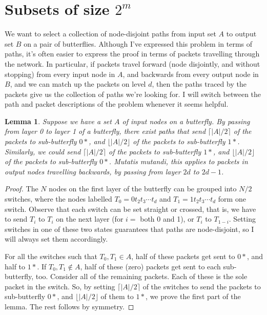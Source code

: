 \documentclass[12pt]{article}
\newtheorem{lemma}{Lemma}
\begin{document}
\section{Subsets of size $2^m$}
We want to select a collection of node-disjoint paths from input set $A$
to output set $B$ on a pair of butterflies.
Although I've expressed this problem in terms of paths, it's often easier
to express the proof in terms of packets travelling through the network.
In particular, if packets travel forward (node disjointly, and
without stopping) from every input node in $A$,
and backwards from every output node in $B$, and we can match up the 
packets on level $d$, then the paths traced by the packets give us the
collection of paths we're looking for.  I will switch between the path
and packet descriptions of the problem whenever it seems helpful.
\begin{lemma} \label{simple splitting}
Suppose we have a set $A$ of input nodes on a butterfly.
By passing from layer 0 to layer 1 of a butterfly, there exist
paths that send
$\lceil |A|/2 \rceil$ of the packets to sub-butterfly $0*$, and 
$\lfloor |A|/2 \rfloor$ of the packets to sub-butterfly $1*$.
Similarly, we could send 
$\lceil |A|/2 \rceil$ of the packets to sub-butterfly $1*$, and 
$\lfloor |A|/2 \rfloor$ of the packets to sub-butterfly $0*$.
Mutatis mutandi, this applies to packets in output nodes
travelling backwards, by passing from layer $2d$ to $2d-1$.
\end{lemma}
\begin{proof}
The $N$ nodes on the first layer of the butterfly can be grouped into 
$N/2$ switches, where the nodes labelled $T_{0}=0t_{2}t_{3}\cdots t_{d}$
and $T_{1}=1t_{2}t_{3}\cdots t_{d}$ form one switch.  Observe that 
each switch can be set straight or crossed, that is, 
we have to send $T_{i}$ to $T_{i}$ on the next layer 
(for $i=$ both 0 and 1), or $T_{i}$ to $T_{1-i}$.  Setting switches in one of 
these two states guarantees that paths are node-disjoint, so I 
will always set them accordingly. 

	For all the switches such that $T_{0},T_{1}\in A$, half
of these packets get sent to $0*$, and half to $1*$.  If 
$T_{0},T_{1}\not\in A$, half of these (zero) packets get sent
to each sub-butterfly, too.  Consider all of the remaining
packets.  Each of these is the sole packet in the switch.  So,
by setting $\lceil |A|/2 \rceil$ of the switches to send the
packets to sub-butterfly $0*$, and $\lfloor |A|/2 \rfloor$ of them 
to $1*$, we prove the first part of the lemma.  The rest
follows by symmetry. \end{proof}
\end{document}
